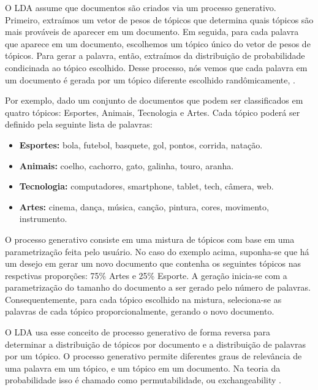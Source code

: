 \documentclass[12pt,a4paper]{article}
\begin{document}
 O LDA assume que documentos são criados via um processo generativo. Primeiro, extraímos um vetor de pesos de tópicos que determina
 quais tópicos são mais prováveis de aparecer em um documento. Em seguida, para cada palavra que aparece em um documento, escolhemos um tópico
 único do vetor de pesos de tópicos. Para gerar a palavra, então, extraímos da distribuição de probabilidade condicinada ao tópico escolhido.
 Desse processo, nós vemos que cada palavra em um documento é gerada por um tópico diferente escolhido randômicamente, \cite{hu2009latent}.

 Por exemplo, dado um conjunto de documentos que podem ser classificados em quatro tópicos: Esportes, Animais, Tecnologia e Artes. 
 Cada tópico poderá ser definido pela seguinte lista de palavras:

\begin{itemize}
  \item \textbf{ Esportes:} bola, futebol, basquete, gol, pontos, corrida, natação.
  \item \textbf{ Animais:} coelho, cachorro, gato, galinha, touro, aranha.
  \item \textbf{ Tecnologia:} computadores, smartphone, tablet, tech, câmera, web.
  \item \textbf{ Artes:} cinema, dança, música, canção, pintura, cores, movimento, instrumento.
\end{itemize}

O processo generativo consiste em uma mistura de tópicos com base em uma parametrização feita pelo usuário. No caso do exemplo acima, suponha-se que há um desejo em gerar um novo documento que contenha os seguintes tópicos nas respctivas proporções: 75\% Artes e 25\% Esporte. A geração inicia-se com a parametrização do tamanho do documento a ser gerado pelo número de palavras. Consequentemente, para cada tópico escolhido na mistura, seleciona-se as palavras de cada tópico proporcionalmente, gerando o novo documento.

 O LDA usa esse conceito de processo generativo de forma reversa para determinar a distribuição de tópicos por documento e a distribuição de palavras por um tópico. 
 O processo generativo permite diferentes graus de relevância de uma palavra em um tópico, e um tópico em um documento. Na teoria da probabilidade isso é chamado como permutabilidade,
 ou exchangeability \cite{aldous1985exchangeability}. 
 
\end{document}

